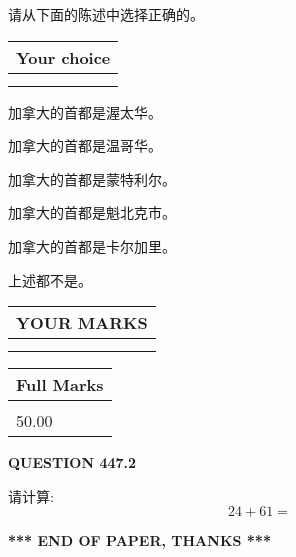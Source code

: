 \documentclass{ctexart}
\begin{document}
  
请从下面的陈述中选择正确的。
  
  
\noindent\hspace{3.0in} \begin{tabular}{|l|}
\hline
Your choice \\
\hline
 \\ 
 \\ 
\hline
\end{tabular}
  
  
 
 
加拿大的首都是渥太华。
 
 
加拿大的首都是温哥华。
 
 
加拿大的首都是蒙特利尔。
 
 
加拿大的首都是魁北克市。
 
 
加拿大的首都是卡尔加里。
 
 
 上述都不是。
 
 
  
\vspace{0.2in}
  
\noindent\begin{tabular}{|l|}
\hline
 YOUR MARKS  \\
\hline
 \\ 
 \\ 
\hline
\end{tabular}
\hspace{0.05in} \begin{tabular}{|l|}
\hline
 Full Marks  \\
\hline
 \\ 
50.00 \\
\hline
\end{tabular}
{\textbf{\Large{QUESTION
447.2 
}}}
  
  
 
请计算:
\begin{equation}
24 +  %
61 = \nonumber
\end{equation}
 

 

 
   
   
 \vspace{0.2in}
 
   
   
   
   
\vspace{1.0in} 
{\textbf{\large{ *** END OF PAPER, THANKS *** }}} 
   
\end{document}
